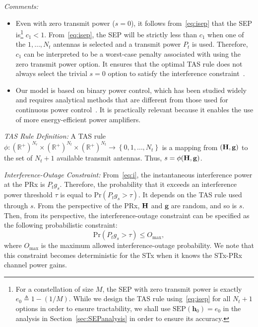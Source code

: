 \documentclass[journal]{IEEEtran}
\newcommand{\brac}[1]{\left({#1}\right)}
\newcommand{\define}{\triangleq}
\newcommand{\mtx}[1]{{\bf #1}} %
\newcommand{\prob}[1]{\text{Pr}\brac{#1}}
\newcommand{\SEP}{\text{SEP}}
\newcommand{\nx}{{0}}
\newcommand{\Nt}{{N_t}}
\newcommand{\Nr}{{N_r}}
\newcommand{\Pt}{{P_t}}
\newcommand{\such}{h}
\newcommand{\puch}{g}
\newcommand{\gk}[1]{{\puch_{#1}}}
\newcommand{\h}{\mathbf{\such}}
\newcommand{\g}{\mathbf{\puch}}
\newcommand{\outmax}{O_{\text{max}}}
\newcommand{\itau}{\tau}
\newcommand{\cone}{c_{1}}
\newcommand{\allopts}{\left\{\nx,1,\ldots,\Nt\right\}}
\newcommand{\asrule}{\phi}
\newcommand{\zerosep}{e_0}
\newcommand{\Hmx}{\mtx{H}}
\begin{document}
{\em Comments:}
\begin{itemize}

\item Even with zero transmit power ($s=\nx$), it follows from~\eqref{eq:isep} that the SEP is\footnote{For a constellation of size $M$, the SEP with zero transmit power is exactly $\zerosep\define 1-\left(1/M\right)$. While we design the TAS rule using~\eqref{eq:isep} for all $\Nt+1$ options in order to ensure tractability, we shall use $\SEP(\h_0) = \zerosep$ in the analysis in Section~\ref{sec:SEPanalysis} in order to ensure its accuracy.} $\cone<1$. From~\eqref{eq:isep}, the SEP will be strictly less than $\cone$ when one of the $1,\ldots,\Nt$ antennas is selected and a  transmit power $\Pt$ is used. Therefore, $\cone$ can be interpreted to be a worst-case penalty associated with using the zero transmit power option. It ensures that the optimal TAS rule does not always select the trivial $s=\nx$ option to satisfy the interference constraint~\cite{Kashyap_2014_TCOM,Sarvendranath_2013_TCOM}. 	


\item Our model is based on binary power control, which has been studied widely~\cite{Kashyap_2013_TWC,Kashyap_2014_TCOM,Hanif_2015_globecom,Sarvendranath_2013_TCOM} and requires analytical methods that are different from those used for continuous power control~\cite{Sarvendranath_2014_TCOM}. It is practically relevant because it enables the use of more energy-efficient power amplifiers.


\end{itemize}


{\em TAS Rule Definition:} A TAS rule $\asrule:\brac{\mathbb{R}^{+}}^{\Nr}\times\brac{\mathbb{R}^{+}}^{\Nt} \times \brac{\mathbb{R}^{+}}^{\Nt} \rightarrow \allopts$ is a mapping from $\left(\Hmx,\g\right)$ to the set of $\Nt+1$ available transmit antennas. Thus, $s = \phi(\Hmx,\g)$.

{\em Interference-Outage Constraint:}
From~\eqref{eq:i}, the instantaneous interference power at the PRx is $\Pt\gk{s}$. Therefore, the probability that it exceeds an interference power threshold $\itau$ is equal to $\prob{\Pt\gk{s}>\itau}$. It depends on the TAS rule used through $s$. From the perspective of the PRx,  $\Hmx$ and $\g$ are random, and so is $s$. Then, from its perspective,  the interference-outage constraint can be specified as  the following probabilistic constraint: 
\begin{equation}
\prob{\Pt\gk{s}>\itau} \leq \outmax,
\label{eq:iop_cons}
\end{equation}
where $\outmax$ is the maximum allowed interference-outage probability. We note that this constraint becomes deterministic for the STx when it knows the STx-PRx channel power gains. 
\end{document}
